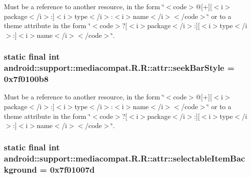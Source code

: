 Must be a reference to another resource, in the form \char`\"{}$<$code$>$@\mbox{[}+\mbox{]}\mbox{[}$<$i$>$package$<$/i$>$:\mbox{]}$<$i$>$type$<$/i$>$:$<$i$>$name$<$/i$>$$<$/code$>$\char`\"{} or to a theme attribute in the form \char`\"{}$<$code$>$?\mbox{[}$<$i$>$package$<$/i$>$:\mbox{]}\mbox{[}$<$i$>$type$<$/i$>$:\mbox{]}$<$i$>$name$<$/i$>$$<$/code$>$\char`\"{}. \hypertarget{classandroid_1_1support_1_1mediacompat_1_1_r_1_1attr_698a4f7798e4ed17b7ac63842aec1001}{
\subsubsection[{seekBarStyle}]{\setlength{\rightskip}{0pt plus 5cm}static final int android::support::mediacompat.R.R::attr::seekBarStyle = 0x7f0100b8}}
\label{classandroid_1_1support_1_1mediacompat_1_1_r_1_1attr_698a4f7798e4ed17b7ac63842aec1001}


Must be a reference to another resource, in the form \char`\"{}$<$code$>$@\mbox{[}+\mbox{]}\mbox{[}$<$i$>$package$<$/i$>$:\mbox{]}$<$i$>$type$<$/i$>$:$<$i$>$name$<$/i$>$$<$/code$>$\char`\"{} or to a theme attribute in the form \char`\"{}$<$code$>$?\mbox{[}$<$i$>$package$<$/i$>$:\mbox{]}\mbox{[}$<$i$>$type$<$/i$>$:\mbox{]}$<$i$>$name$<$/i$>$$<$/code$>$\char`\"{}. \hypertarget{classandroid_1_1support_1_1mediacompat_1_1_r_1_1attr_7cb8a3f2a6679454d0a5c8448a560836}{
\subsubsection[{selectableItemBackground}]{\setlength{\rightskip}{0pt plus 5cm}static final int android::support::mediacompat.R.R::attr::selectableItemBackground = 0x7f01007d}}
\label{classandroid_1_1support_1_1mediacompat_1_1_r_1_1attr_7cb8a3f2a6679454d0a5c8448a560836}


